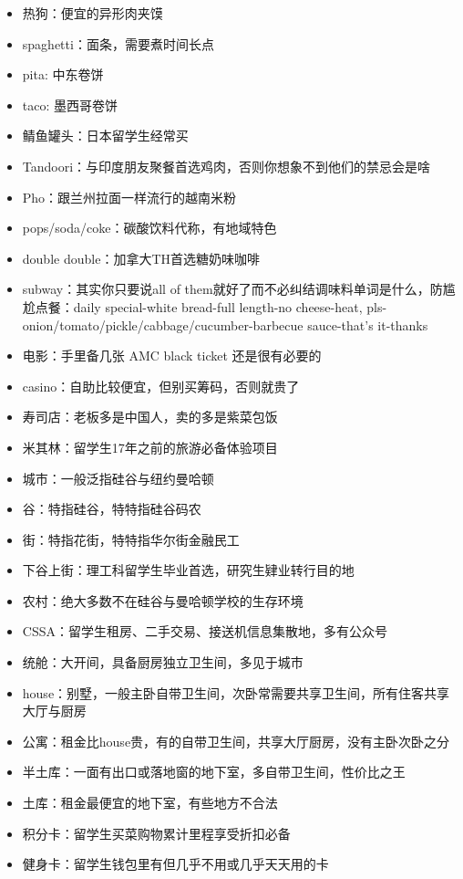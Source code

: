 \documentclass[]{tufte-book}
\begin{document}
\begin{itemize}
\item
  热狗：便宜的异形肉夹馍
\item
  spaghetti：面条，需要煮时间长点
\item
  pita: 中东卷饼
\item
  taco: 墨西哥卷饼
\item
  鲭鱼罐头：日本留学生经常买
\item
  Tandoori：与印度朋友聚餐首选鸡肉，否则你想象不到他们的禁忌会是啥
\item
  Pho：跟兰州拉面一样流行的越南米粉
\item
  pops/soda/coke：碳酸饮料代称，有地域特色
\item
  double double：加拿大TH首选糖奶味咖啡
\item
  subway：其实你只要说all of them就好了而不必纠结调味料单词是什么，防尴尬点餐：daily special-white bread-full length-no cheese-heat, pls-onion/tomato/pickle/cabbage/cucumber-barbecue sauce-that's it-thanks
\item
  电影：手里备几张 AMC black ticket 还是很有必要的
\item
  casino：自助比较便宜，但别买筹码，否则就贵了
\item
  寿司店：老板多是中国人，卖的多是紫菜包饭
\item
  米其林：留学生17年之前的旅游必备体验项目
\item
  城市：一般泛指硅谷与纽约曼哈顿
\item
  谷：特指硅谷，特特指硅谷码农
\item
  街：特指花街，特特指华尔街金融民工
\item
  下谷上街：理工科留学生毕业首选，研究生肄业转行目的地
\item
  农村：绝大多数不在硅谷与曼哈顿学校的生存环境
\item
  CSSA：留学生租房、二手交易、接送机信息集散地，多有公众号
\item
  统舱：大开间，具备厨房独立卫生间，多见于城市
\item
  house：别墅，一般主卧自带卫生间，次卧常需要共享卫生间，所有住客共享大厅与厨房
\item
  公寓：租金比house贵，有的自带卫生间，共享大厅厨房，没有主卧次卧之分
\item
  半土库：一面有出口或落地窗的地下室，多自带卫生间，性价比之王
\item
  土库：租金最便宜的地下室，有些地方不合法
\item
  积分卡：留学生买菜购物累计里程享受折扣必备
\item
  健身卡：留学生钱包里有但几乎不用或几乎天天用的卡

\end{itemize}
\end{document}

